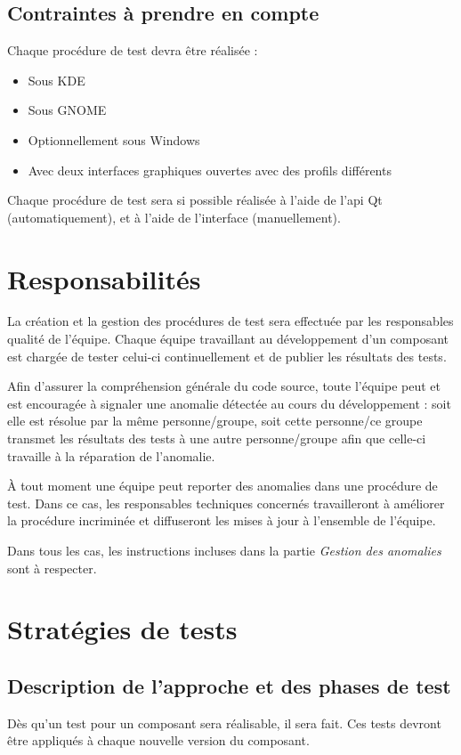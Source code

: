 \documentclass{../res/univ-projet}
\begin{document}
\subsection{Contraintes à prendre en compte}
Chaque procédure de test devra être réalisée :
\begin{itemize}
 \item Sous KDE
 \item Sous GNOME
 \item Optionnellement sous Windows
 \item Avec deux interfaces graphiques ouvertes avec des profils différents
\end{itemize}
Chaque procédure de test sera si possible réalisée à l'aide de l'api Qt (automatiquement), et à l'aide de l'interface (manuellement).



\section{Responsabilités}

  La création et la gestion des procédures de test sera effectuée par les responsables qualité de l'équipe. Chaque équipe travaillant au développement d'un composant est chargée de tester celui-ci continuellement et de publier les résultats des tests.
  
  Afin d'assurer la compréhension générale du code source, toute l'équipe peut et est encouragée à signaler une anomalie détectée au cours du développement : soit elle est résolue par la même personne/groupe, soit cette personne/ce groupe transmet les résultats 
  des tests à une autre personne/groupe afin que celle-ci travaille à la réparation de l'anomalie.
  
  À tout moment une équipe peut reporter des anomalies dans une procédure de test. Dans ce cas, les responsables techniques concernés travailleront à améliorer la procédure incriminée et diffuseront les mises à jour à l'ensemble de l'équipe.

  Dans tous les cas, les instructions incluses dans la partie \emph{Gestion des anomalies} sont à respecter.


\section{Stratégies de tests}

\subsection{Description de l'approche et des phases de test}
Dès qu'un test pour un composant sera réalisable, il sera fait. Ces tests devront être appliqués à chaque nouvelle version du composant.
\end{document}
